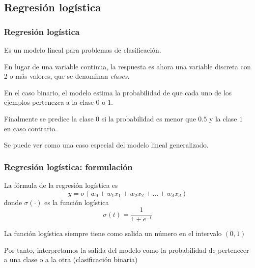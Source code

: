 \documentclass{beamer}
\newenvironment{wideitemize}{\itemize\addtolength{\itemsep}{12pt}}{\enditemize}
\begin{document}
\subsection{Regresión logística}

\begin{frame}
\frametitle{Regresión logística}

\begin{wideitemize}
\item Es un modelo lineal para problemas de clasificación.
\item En lugar de una variable continua, la respuesta es ahora una variable discreta con $2$ o más valores, que se denominan \textit{clases}.
\item En el caso binario, el modelo estima la probabilidad de que cada uno de los ejemplos pertenezca a la clase $0$ o $1$.
\item Finalmente se predice la clase $0$ si la probabilidad es menor que $0.5$ y la clase $1$ en caso contrario.
\item Se puede ver como una caso especial del modelo lineal generalizado.
\end{wideitemize}
\end{frame}

\begin{frame}
\frametitle{Regresión logística: formulación}

\begin{wideitemize}
\item La fórmula de la regresión logística es
$$y = \sigma(w_0 + w_1x_1 + w_2x_2 + ... + w_dx_d)$$
donde $\sigma(\cdot)$ es la función logística
$$\sigma(t) = \frac{1}{1 + e^{-t}}$$

\item La función logística siempre tiene como salida un número en el intervalo $(0, 1)$

\item Por tanto, interpretamos la salida del modelo como la probabilidad de pertenecer a una clase o a la otra (clasificación binaria)

\end{wideitemize}
\end{frame}
\end{document}
